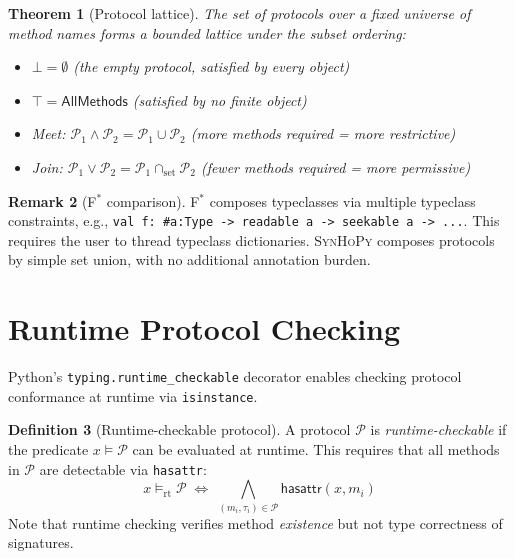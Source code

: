 \documentclass[11pt,a4paper]{report}
\theoremstyle{definition}
\newtheorem{definition}{Definition}[chapter]
\newtheorem{remark}[definition]{Remark}
\theoremstyle{plain}
\newtheorem{theorem}[definition]{Theorem}
\newcommand{\fstar}{F$^{*}$}
\newcommand{\synhopy}{\textsc{SynHoPy}}
\begin{document}
\begin{theorem}[Protocol lattice]
The set of protocols over a fixed universe of method names forms a bounded lattice
under the subset ordering:
\begin{itemize}
  \item $\bot = \emptyset$ (the empty protocol, satisfied by every object)
  \item $\top = \mathsf{AllMethods}$ (satisfied by no finite object)
  \item Meet: $\mathcal{P}_1 \wedge \mathcal{P}_2 = \mathcal{P}_1 \cup \mathcal{P}_2$
    (more methods required = more restrictive)
  \item Join: $\mathcal{P}_1 \vee \mathcal{P}_2 = \mathcal{P}_1 \cap_{\mathrm{set}} \mathcal{P}_2$
    (fewer methods required = more permissive)
\end{itemize}
\end{theorem}

\begin{remark}[\fstar{} comparison]
\fstar{} composes typeclasses via multiple typeclass constraints, e.g.,
\lstinline[style=fstar]|val f: #a:Type -> readable a -> seekable a -> ...|.
This requires the user to thread typeclass dictionaries. \synhopy{} composes
protocols by simple set union, with no additional annotation burden.
\end{remark}


\section{Runtime Protocol Checking}
\label{sec:runtime-protocol}

Python's \texttt{typing.runtime\_checkable} decorator enables checking protocol
conformance at runtime via \texttt{isinstance}.

\begin{definition}[Runtime-checkable protocol]
A protocol $\mathcal{P}$ is \emph{runtime-checkable} if the predicate
$x \models \mathcal{P}$ can be evaluated at runtime. This requires that all
methods in $\mathcal{P}$ are detectable via \lstinline[style=python]|hasattr|:
\[
  x \models_{\mathrm{rt}} \mathcal{P} \;\Longleftrightarrow\;
  \bigwedge_{(m_i, \tau_i) \in \mathcal{P}} \mathsf{hasattr}(x, m_i)
\]
Note that runtime checking verifies method \emph{existence} but not type
correctness of signatures.
\end{definition}
\end{document}
